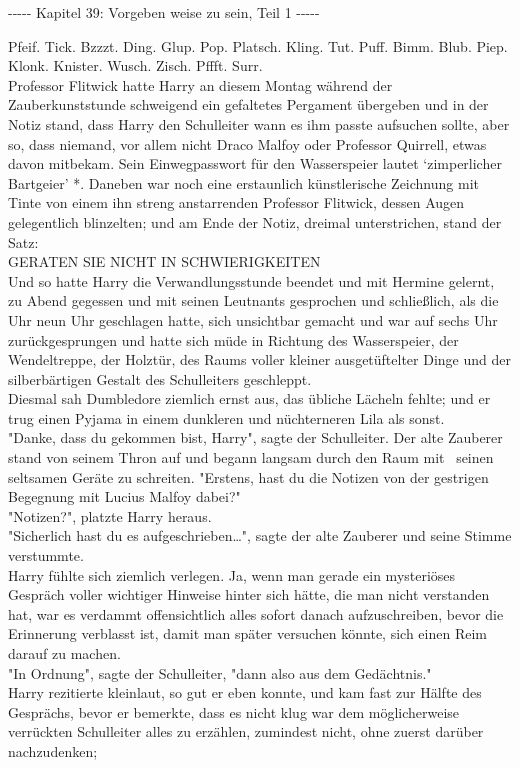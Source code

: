 

\hypertarget{vorgeben-weise-zu-sein---teil-1}{%

-\/-\/-\/-\/- Kapitel 39: Vorgeben weise zu sein, Teil 1 -\/-\/-\/-\/-

Pfeif. Tick. Bzzzt. Ding. Glup. Pop. Platsch. Kling. Tut. Puff. Bimm. Blub. Piep. Klonk. Knister. Wusch. Zisch. Pffft. Surr.\\ Professor Flitwick hatte Harry an diesem Montag während der Zauberkunststunde schweigend ein gefaltetes Pergament übergeben und in der Notiz stand, dass Harry den Schulleiter wann es ihm passte aufsuchen sollte, aber so, dass niemand, vor allem nicht Draco Malfoy oder Professor Quirrell, etwas davon mitbekam. Sein Einwegpasswort für den Wasserspeier lautet `zimperlicher Bartgeier' *. Daneben war noch eine erstaunlich künstlerische Zeichnung mit Tinte von einem ihn streng anstarrenden Professor Flitwick, dessen Augen gelegentlich blinzelten; und am Ende der Notiz, dreimal unterstrichen, stand der Satz:\\ GERATEN SIE NICHT IN SCHWIERIGKEITEN\\ Und so hatte Harry die Verwandlungsstunde beendet und mit Hermine gelernt, zu Abend gegessen und mit seinen Leutnants gesprochen und schließlich, als die Uhr neun Uhr geschlagen hatte, sich unsichtbar gemacht und war auf sechs Uhr zurückgesprungen und hatte sich müde in Richtung des Wasserspeier, der Wendeltreppe, der Holztür, des Raums voller kleiner ausgetüftelter Dinge und der silberbärtigen Gestalt des Schulleiters geschleppt.\\ Diesmal sah Dumbledore ziemlich ernst aus, das übliche Lächeln fehlte; und er trug einen Pyjama in einem dunkleren und nüchterneren Lila als sonst.\\ "Danke, dass du gekommen bist, Harry", sagte der Schulleiter. Der alte Zauberer stand von seinem Thron auf und begann langsam durch den Raum mit ~seinen seltsamen Geräte zu schreiten. "Erstens, hast du die Notizen von der gestrigen Begegnung mit Lucius Malfoy dabei?"\\ "Notizen?", platzte Harry heraus.\\ "Sicherlich hast du es aufgeschrieben…", sagte der alte Zauberer und seine Stimme verstummte.\\ Harry fühlte sich ziemlich verlegen. Ja, wenn man gerade ein mysteriöses Gespräch voller wichtiger Hinweise hinter sich hätte, die man nicht verstanden hat, war es verdammt offensichtlich alles sofort danach aufzuschreiben, bevor die Erinnerung verblasst ist, damit man später versuchen könnte, sich einen Reim darauf zu machen.\\ "In Ordnung", sagte der Schulleiter, "dann also aus dem Gedächtnis."\\ Harry rezitierte kleinlaut, so gut er eben konnte, und kam fast zur Hälfte des Gesprächs, bevor er bemerkte, dass es nicht klug war dem möglicherweise verrückten Schulleiter alles zu erzählen, zumindest nicht, ohne zuerst darüber nachzudenken; }
